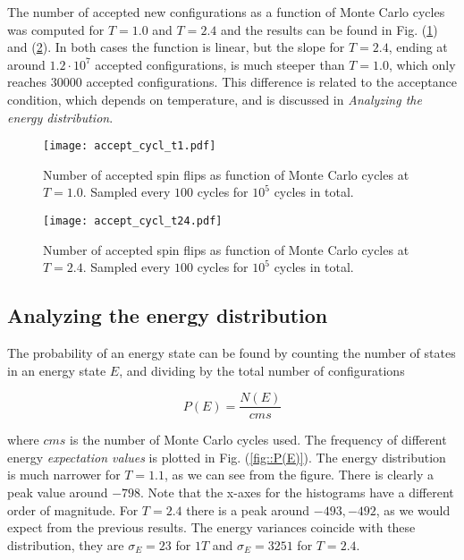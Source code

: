 \documentclass[11pt]{article}
\begin{document}
\begin{flushleft}
The number of accepted new configurations as a function of Monte Carlo cycles was computed for $T=1.0$ and $T=2.4$ and the results can be found in Fig. (\ref{fig::no accept 1}) and (\ref{fig::no accept 2.4}). In both cases the function is linear, but the slope for $T=2.4$, ending at around $1.2 \cdot 10^7$ accepted configurations, is much steeper than $T=1.0$, which only reaches $30000$ accepted configurations. This difference is related to the acceptance condition, which depends on temperature, and is discussed in \textit{Analyzing the energy distribution}.


\begin{figure}[H]
\centering
\texttt{[image: accept\_cycl\_t1.pdf]}
\caption{Number of accepted spin flips as function of Monte Carlo cycles at $T=1.0$. Sampled every $100$ cycles for $10^5$ cycles in total.}
\label{fig::no accept 1}
\end{figure}

\begin{figure}[H]
\centering
\texttt{[image: accept\_cycl\_t24.pdf]}
\caption{Number of accepted spin flips as function of Monte Carlo cycles at $T=2.4$. Sampled every $100$ cycles for $10^5$ cycles in total.}
\label{fig::no accept 2.4}
\end{figure}

\end{flushleft}


\subsection*{Analyzing the energy distribution}



\begin{flushleft}
The probability of an energy state can be found by counting the number of states in an energy state $E$, and dividing by the total number of configurations

\begin{equation}
P(E) = \frac{N(E)}{cms}
\end{equation}

where $cms$ is the number of Monte Carlo cycles used. The frequency of different energy \textit{expectation values} is plotted in  Fig. (\ref{fig::P(E)}). The energy distribution is much narrower for $T=1.1$, as we can see from the figure. There is clearly a peak value around $-798$. Note that the x-axes for the histograms have a different order of magnitude. For $T=2.4$ there is a peak around $-493,-492$, as we would expect from the previous results. The energy variances coincide with these distribution, they are $ \sigma_E = 23$ for $1T$ and $\sigma_E = 3251$ for $T=2.4$.

\end{flushleft}
\end{document}
